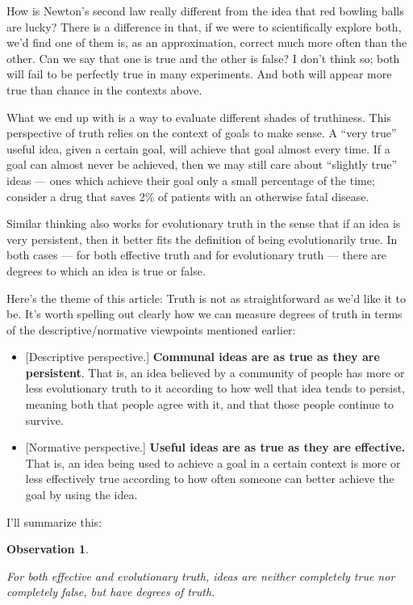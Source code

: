 \documentclass[11pt, oneside]{article}   	%
\newtheorem{obs}{Observation}
\begin{document}
How is Newton's second law really different from the idea that red bowling balls
are
lucky? There is a difference in that, if we were to scientifically explore both,
we'd find one of them is, as an approximation, correct much more often than the
other. Can we say that one is true and the other is false? I don't think so;
both will fail to be perfectly true in many experiments. And both will appear
more true than chance in the contexts above.

What we end up with is a way to evaluate different shades of truthiness.
This perspective of truth relies on the context of goals to make sense.
A ``very true'' useful idea, given
a certain goal, will achieve that goal almost every time. If a goal can
almost never be achieved, then we may still care about ``slightly true'' ideas
--- ones which achieve their goal only a small percentage of the time;
consider a drug that saves 2\% of patients with an otherwise fatal disease.

Similar thinking also works for evolutionary truth in the sense that if an idea
is very persistent, then it better fits the definition of being evolutionarily
true. In both cases --- for both effective truth and for evolutionary truth ---
there are degrees to which an idea is true or false.

Here's the theme of this article:
Truth is not as straightforward as we'd like it to be.
It's worth spelling out clearly how we can measure degrees of truth in terms of
the descriptive/normative viewpoints mentioned earlier:
\begin{itemize}
    \item{} [Descriptive perspective.]
        {\bf Communal ideas are as true as they are
        persistent}.
        That is, an idea believed by a community of people has
        more or less evolutionary truth to it according to how well that
        idea tends to persist, meaning both that people agree with it, and
        that those people continue to survive.
    \item{} [Normative perspective.]
        {\bf Useful ideas are as true as they are effective.}
        That is, an idea being used to achieve a goal in a certain context
        is more or less effectively true according to how often someone can
        better achieve the goal by using the idea.
\end{itemize}

I'll summarize this:
\newcommand{\obstwo}{
    For both
    effective and evolutionary truth,
    ideas are neither completely true nor completely false, but have degrees of
    truth.
}
\begin{obs}\label{o2}
    \obstwo
\end{obs}
\end{document}

